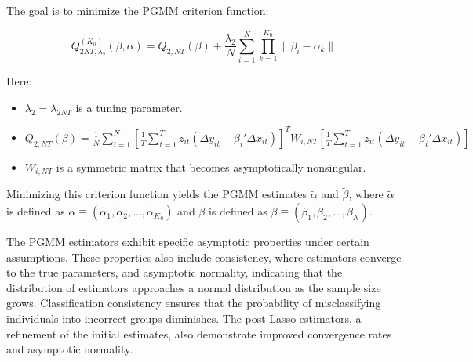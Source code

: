 \documentclass[UTF8,a4paper,10pt]{article}
\begin{document}


The goal is to minimize the PGMM criterion function:

\[ Q_{ 2NT, \lambda_2}^{(K_0)}(\beta, \alpha) = Q_{2,NT}(\beta) + \frac{\lambda_2}{N} \sum_{i=1}^{N} \prod_{k=1}^{K_0}  \| \beta_i - \alpha_k \|\]

Here:
\begin{itemize}
    \item $\lambda_2 = \lambda_{2NT}$ is a tuning parameter.
    \item $Q_{2,NT}(\beta) = \frac{1}{N} \sum_{i=1}^{N} \left[\frac{1}{T} \sum_{t=1}^{T} z_{it} (\Delta{y}_{it} - \beta_i' \Delta{x}_{it})\right]^T W_{i,NT} \left[\frac{1}{T} \sum_{t=1}^{T} z_{it} (\Delta{y}_{it} - \beta_i' \Delta{x}_{it})\right]$
    \item $W_{i,NT}$ is a symmetric matrix that becomes asymptotically nonsingular.
\end{itemize}

Minimizing this criterion function yields the PGMM estimates $\tilde{\alpha}$ and $\tilde{\beta}$, where $\tilde{\alpha}$ is defined as $\tilde{\alpha} \equiv (\tilde{\alpha}_1, \tilde{\alpha}_2, \ldots, \tilde{\alpha}_{K_0})$ and $\tilde{\beta}$ is defined as $\tilde{\beta} \equiv (\tilde{\beta}_1, \tilde{\beta}_2, \ldots, \tilde{\beta}_N)$.

The PGMM estimators exhibit specific asymptotic properties under certain assumptions. These properties also include consistency, where estimators converge to the true parameters, and asymptotic normality, indicating that the distribution of estimators approaches a normal distribution as the sample size grows. Classification consistency ensures that the probability of misclassifying individuals into incorrect groups diminishes. The post-Lasso estimators, a refinement of the initial estimates, also demonstrate improved convergence rates and asymptotic normality. 

\end{document}

